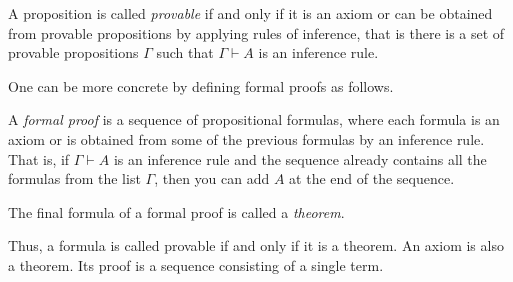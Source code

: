 \begin{page}
\setcounter{section}{2}
\setcounter{subsection}{1}
\setcounter{dfn}{1}
\label{portion:417}

\begin{dfn}
A proposition is called \emph{provable} if and only if it is an axiom or can be obtained from provable propositions by applying rules of inference,
that is there is a set of provable propositions $\Gamma$ such that $\Gamma \vdash A$ is an inference rule.
\end{dfn}

\end{page}

\begin{page}
\setcounter{section}{2}
\setcounter{subsection}{1}
\setcounter{dfn}{1}
\label{portion:418}


One can be more concrete by defining formal proofs as follows.

\end{page}

\begin{page}
\setcounter{section}{2}
\setcounter{subsection}{1}
\setcounter{dfn}{2}
\label{portion:420}

\begin{dfn}
\label{dfn:HilbertProof}
A \emph{formal proof} is a sequence of propositional formulas,
where each formula is an axiom or is obtained from some of the previous formulas by an inference rule.
That is, if $\Gamma \vdash A$ is an inference rule and the sequence already contains all the formulas from the list $\Gamma$,
then you can add $A$ at the end of the sequence.

The final formula of a formal proof is called a \emph{theorem}.
\end{dfn}

\end{page}

\begin{page}
\setcounter{section}{2}
\setcounter{subsection}{1}
\setcounter{dfn}{2}
\label{portion:421}

Thus, a formula is called provable if and only if it is a theorem.
An axiom is also a theorem.
Its proof is a sequence consisting of a single term.



\end{page}


